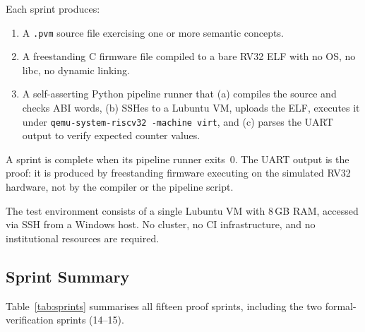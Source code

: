 \documentclass[11pt,a4paper]{article}
\begin{document}
Each sprint produces:
\begin{enumerate}
\item A \texttt{.pvm} source file exercising one or more semantic concepts.
\item A freestanding C firmware file compiled to a bare RV32 ELF with no OS,
  no libc, no dynamic linking.
\item A self-asserting Python pipeline runner that (a) compiles the source and
  checks ABI words, (b) SSHes to a Lubuntu VM, uploads the ELF, executes it
  under \texttt{qemu-system-riscv32 -machine virt}, and (c) parses the UART
  output to verify expected counter values.
\end{enumerate}

A sprint is complete when its pipeline runner exits~0. The UART output is
the proof: it is produced by freestanding firmware executing on the simulated
RV32 hardware, not by the compiler or the pipeline script.

The test environment consists of a single Lubuntu VM with 8\,GB RAM, accessed
via SSH from a Windows host. No cluster, no CI infrastructure, and no
institutional resources are required.

\subsection{Sprint Summary}
\label{sec:sprints}

Table~\ref{tab:sprints} summarises all fifteen proof sprints, including the two formal-verification sprints (14--15).
\end{document}
